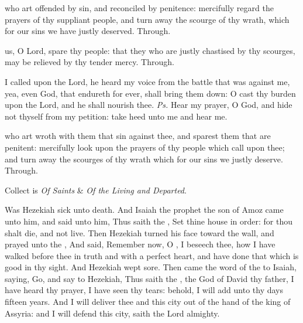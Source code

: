 \begin{paracol}{2}

 who art offended by sin, and reconciled by penitence: mercifully regard the prayers of thy suppliant people, and turn away the scourge of thy wrath, which for our sins we have justly deserved. Through.

\switchcolumn


 us, O Lord, spare thy people: that they who are justly chastised by thy scourges, may be relieved by thy tender mercy. Through.

\end{paracol}

\introit
{} I called upon the Lord, he heard my voice from the battle that was against me, yea, even God, that endureth for ever, shall bring them down: O cast thy burden upon the Lord, and he shall nourish thee. \textit{Ps.} Hear my prayer, O God, and hide not thyself from my petition: take heed unto me and hear me.

\collect
{} who art wroth with them that sin against thee, and sparest them that are penitent: mercifully look upon the prayers of thy people which call upon thee; and turn away the scourges of thy wrath which for our sins we justly deserve. Through.

\begin{rubric}
     Collect is \emph{Of Saints} \&  \emph{Of the Living and Departed}.
\end{rubric}

 Was Hezekiah sick unto death. And Isaiah the prophet the son of Amoz came unto him, and said unto him, Thus saith the , Set thine house in order: for thou shalt die, and not live. Then Hezekiah turned his face toward the wall, and prayed unto the , And said, Remember now, O , I beseech thee, how I have walked before thee in truth and with a perfect heart, and have done that which is good in thy sight. And Hezekiah wept sore. Then came the word of the  to Isaiah, saying, Go, and say to Hezekiah, Thus saith the , the God of David thy father, I have heard thy prayer, I have seen thy tears: behold, I will add unto thy days fifteen years. And I will deliver thee and this city out of the hand of the king of Assyria: and I will defend this city, saith the Lord almighty.

